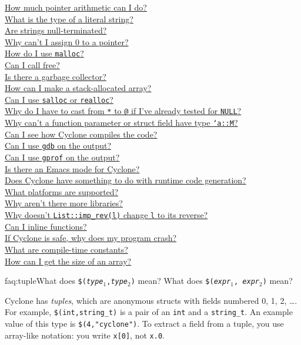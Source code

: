 \begin{small}
\hyperlink{faq:pointerarith}{How much pointer arithmetic can I do?}\\
\hyperlink{faq:litstring}{What is the type of a literal string?}\\
\hyperlink{faq:nullterminate}{Are strings null-terminated?}\\
\hyperlink{faq:zero}{Why can't I assign 0 to a pointer?}\\
\hyperlink{faq:malloc}{How do I use \texttt{malloc}?}\\
\hyperlink{faq:free}{Can I call free?}\\
\hyperlink{faq:gc}{Is there a garbage collector?}\\
\hyperlink{faq:stackalloc}{How can I make a stack-allocated array?}\\
\hyperlink{faq:realloc}{Can I use \texttt{salloc} or \texttt{realloc}?}\\
\hyperlink{faq:nullcast}{Why do I have to cast from \texttt{*} to \texttt{@} if I've already tested for \texttt{NULL}?}\\
\hyperlink{faq:memkind}{Why can't a function parameter or struct field have type \texttt{`a::M}?}\\
\hyperlink{faq:compile}{Can I see how Cyclone compiles the code?}\\
\hyperlink{faq:gdb}{Can I use \texttt{gdb} on the output?}\\
\hyperlink{faq:gprof}{Can I use \texttt{gprof} on the output?}\\
\hyperlink{faq:emacs}{Is there an Emacs mode for Cyclone?}\\
\hyperlink{faq:rtcg}{Does Cyclone have something to do with runtime code generation?}\\
\hyperlink{faq:platforms}{What platforms are supported?}\\
\hyperlink{faq:libs}{Why aren't there more libraries?}\\
\hyperlink{faq:imprev}{Why doesn't \texttt{List::imp_rev(l)} change \texttt{l} to its reverse?}\\
\hyperlink{faq:inline}{Can I inline functions?}\\
\hyperlink{faq:crash}{If Cyclone is safe, why does my program crash?}\\
\hyperlink{faq:ctc}{What are compile-time constants?}\\
\hyperlink{faq:arraysize}{How can I get the size of an array?}
\end{small}
\fi

\begin{faqa}{faq:tuple}{What does \texttt{\$({\it type}$_1$,{\it type}$_2$)} mean?  What does \texttt{\$({\it expr}$_1$, {\it expr}$_2$)} mean?}

Cyclone has \emph{tuples}, which are anonymous structs with fields
numbered 0, 1, 2, \ldots.  For example, \texttt{\$(int,string_t)} is a
pair of an \texttt{int} and a \texttt{string_t}.  An example value of
this type is \texttt{\$(4,"cyclone")}.  To extract a field from a
tuple, you use array-like notation: you write \texttt{x[0]}, not
\texttt{x.0}.
\end{faqa}

